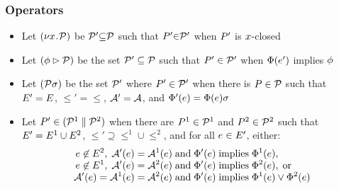 \documentclass[t,aspectratio=169]{beamer} %
\begin{document}
\begin{frame}
  \frametitle{Operators}
  \begin{itemize}[<+->]
  \item 
    Let $(\nu x\!\mathbin.\!\mathcal{P})$ be  $\mathcal{P}'{\subseteq}\mathcal{P}$ such that $P'{\in}\mathcal{P}'$
    when $P'$ is $x$-closed
  \item 
    Let $(\phi \mathbin\rhd \mathcal{P})$ be the set $\mathcal{P}'\subseteq\mathcal{P}$ such that
    $P'\in\mathcal{P}'$ when $\Phi(e')$ implies $\phi$
  \item 
    Let $(\mathcal{P}\sigma)$ be the set $\mathcal{P}'$ where $P'\in\mathcal{P}'$ when there is
    $P\in\mathcal{P}$ such that\\ $E' = E$, ${\le'} = {\le}$,
    $\mathcal{A}' = \mathcal{A}$, and
    $\Phi'(e) = \Phi(e)\sigma$
    
    
  \item 
    Let $P' \in (\mathcal{P}^1 \parallel \mathcal{P}^2)$ when there are
    $P^1 \in \mathcal{P}^1$ and $P^2 \in \mathcal{P}^2$ such that
    \\%
    $E' = E^1 \cup E^2$,
    ${\le'}\supseteq{\le^1}\cup{\le^2}$, and for all $e\in E'$, either:
    \begin{gather*}
      \begin{aligned}
        e \not\in E^2,\; \mathcal{A}'(e) &= \mathcal{A}^1(e) \;\allowbreak\text{and}\allowbreak\; \Phi'(e) \; \allowbreak\text{implies}\allowbreak\; \Phi^1(e),
        \\[-1ex]
        e \not\in E^1,\; \mathcal{A}'(e) &= \mathcal{A}^2(e) \;\allowbreak\text{and}\allowbreak\; \Phi'(e) \; \allowbreak\text{implies}\allowbreak\; \Phi^2(e),\; \allowbreak\text{or}\allowbreak\;
        \\[-1ex]
        \mathcal{A}'(e) = \mathcal{A}^1(e) &= \mathcal{A}^2(e) \;\allowbreak\text{and}\allowbreak\; \Phi'(e) \; \allowbreak\text{implies}\allowbreak\; \Phi^1(e) \lor \Phi^2(e)
      \end{aligned}
    \end{gather*}
  \end{itemize}
\end{frame}
\end{document}
